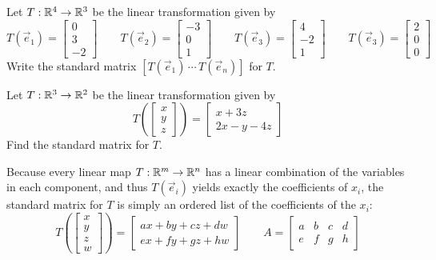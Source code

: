 \begin{applicationActivities}
\begin{activity}{3}
  Let $T: \mathbb{R}^4 \rightarrow \mathbb{R}^3$ be the linear transformation given by
  \[
    T\left(\vec e_1 \right)
  =
    \begin{bmatrix} 0 \\ 3 \\ -2\end{bmatrix}
  \hspace{2em}
    T\left(\vec e_2 \right)
  =
    \begin{bmatrix} -3 \\ 0 \\ 1\end{bmatrix}
  \hspace{2em}
    T\left(\vec e_3 \right)
  =
    \begin{bmatrix} 4 \\ -2 \\ 1\end{bmatrix}
  \hspace{2em}
    T\left(\vec e_3 \right)
  =
    \begin{bmatrix} 2 \\ 0 \\ 0\end{bmatrix}
  \]
Write the standard matrix \([T(\vec e_1) \,\cdots\, T(\vec e_n)]\) for \(T\).
\end{activity}

\begin{activity}{5}
  Let $T: \mathbb{R}^3 \rightarrow \mathbb{R}^2$ be the linear transformation given by
$$T\left(\begin{bmatrix} x\\ y \\ z \end{bmatrix} \right) = \begin{bmatrix} x+3z \\ 2x-y-4z \end{bmatrix}$$
Find the standard matrix for \(T\).
\end{activity}

\begin{fact}
  Because every linear map \(T:\mathbb{R}^m\to\mathbb{R}^n\) has a linear combination
  of the variables in each component, and thus
  \(T(\vec e_i)\) yields exactly the coefficients of \(x_i\),
  the standard matrix for \(T\) is simply an ordered list of
  the coefficients of the \(x_i\):
  \[
    T\left(\begin{bmatrix}x\\y\\z\\w\end{bmatrix}\right)
      =
    \begin{bmatrix}
      ax+by+cz+dw \\
      ex+fy+gz+hw
    \end{bmatrix}
  \hspace{2em}
    A
      =
    \begin{bmatrix}
      a & b & c & d \\
      e & f & g & h
    \end{bmatrix}
  \]
\end{fact}


\end{applicationActivities}
